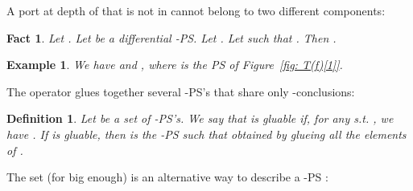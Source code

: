 \documentclass{article}
\theoremstyle{plain}
\newtheorem{definition}{Definition}
\newtheorem{example}{Example}
\newtheorem{fact}[theorem]{Fact}
\begin{document}
\begin{comment}
\begin{remark}
For any -PS , for any , we have .
\end{remark}
\end{comment}

A port at depth  of  that is not in  cannot belong to two different components:

\begin{fact}\label{fact: two components with a common port}
Let . Let  be a differential -PS. Let . Let  such that . Then .
\end{fact}

\begin{comment}
\begin{proof}
By Remark~\ref{remark: substructures characterized by ports}, it is enough to prove .

Let  and let . There exists a finite sequence  of elements of  such that
,  and\begin{itemize}
\item for any , we have ;
\item for any , we have .
\end{itemize}
We prove, by induction on , that, for any , we have . By assumption, we have . Now, assume that  and . We have , hence . But we have  and , so .
\end{proof}
\end{comment}

\begin{example}
We have  and , where  is the PS of Figure~\ref{fig: T(f)[1]}.
\end{example}

\begin{comment}
\begin{fact}\label{fact: cosize of connected}
Let . Let  be a differential -PS. Let . Let . Let . Then .
\end{fact}
\end{comment}

The operator  glues together several -PS's that share only -conclusions:

\begin{definition}
Let  be a set of -PS's. We say that  is \emph{gluable} if, for any 
 s.t. , we have . 
If  is gluable, then  is the -PS such that  obtained by glueing all the elements of .
\end{definition}



The set  (for  big enough) is an alternative way to describe a -PS :
\end{document}
